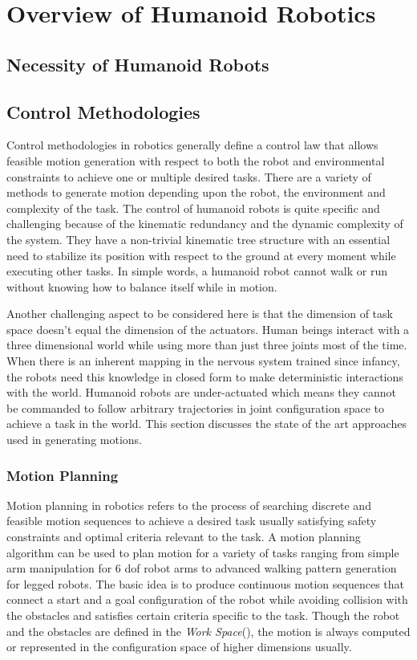 \section{Overview of Humanoid Robotics}
\subsection{Necessity of Humanoid Robots}
\subsection{Control Methodologies}
Control methodologies in robotics generally define a control law that allows feasible motion generation with respect to both the robot and environmental constraints to achieve one or multiple desired tasks. There are a variety of methods to generate motion depending upon the robot, the environment and complexity of the task. The control of humanoid robots is quite specific and challenging because of the kinematic redundancy and the dynamic complexity of the system. They have a non-trivial kinematic tree structure with an essential need to stabilize its position with respect to the ground at every moment while executing other tasks. In simple words, a humanoid robot cannot walk or run without knowing how to balance itself while in motion. 

Another challenging aspect to be considered here is that the dimension of task space doesn't equal the dimension of the actuators. Human beings interact with a three dimensional world while using more than just three joints most of the time. When there is an inherent mapping in the nervous system trained since infancy, the robots need this knowledge in closed form to make deterministic interactions with the world. Humanoid robots are under-actuated which means they cannot be commanded to follow arbitrary trajectories in joint configuration space to achieve a task in the world. This section discusses the state of the art 
approaches used in generating motions.

\subsubsection{Motion Planning}
Motion planning in robotics refers to the process of searching discrete and feasible motion sequences to achieve a desired task usually satisfying safety constraints and optimal criteria relevant to the task. A motion planning algorithm can be used to plan motion for a variety of tasks ranging from simple arm manipulation for 6 dof robot arms to advanced walking pattern generation for legged robots. The basic idea is to produce continuous motion sequences that connect a start and a goal configuration of the robot while avoiding collision with the obstacles and satisfies certain criteria specific to the task. Though the robot and the obstacles are defined in the \textit{Work Space}(\WS), the motion is always computed or represented in the configuration space of higher dimensions usually.  

